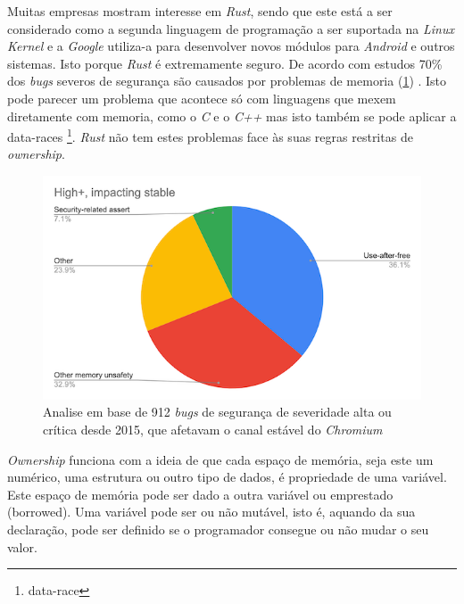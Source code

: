 Muitas empresas mostram interesse em \textit{Rust}, sendo que este está a ser considerado como a segunda linguagem de programação a ser suportada na \textit{Linux Kernel} e a \textit{Google} utiliza-a para desenvolver novos módulos para \textit{Android} e outros sistemas. Isto porque \textit{Rust} é extremamente seguro. De acordo com estudos 70\% dos \textit{bugs} severos de segurança são causados por problemas de memoria (\cref{fig:memory-errors}) \cite{microsoft_safety} \cite{chromium_safety}. Isto pode parecer um problema que acontece só com linguagens que mexem diretamente com memoria, como o \textit{C} e o \textit{C++} mas isto também se pode  aplicar a \glspl{data-race}
\footnote{\glsdesc{data-race}}.
\textit{Rust} não tem estes problemas face
às suas regras restritas de \textit{ownership}.

\begin{figure}[H]
    \centering
    \includegraphics[width=\textwidth]{images/memory-errors.png}
    \caption{Analise em base de 912 \textit{bugs} de segurança de severidade alta ou crítica desde 2015, que afetavam o canal estável do \textit{Chromium} \cite{chromium_safety}}
    \label{fig:memory-errors}
\end{figure}



\textit{Ownership} funciona com a ideia de que cada espaço de memória, seja este um numérico, uma estrutura ou outro tipo de dados, é propriedade de uma variável. Este espaço de memória pode ser dado a outra variável ou emprestado (borrowed). Uma variável pode ser ou não mutável, isto é, aquando da sua declaração, pode ser definido se o programador consegue ou não mudar o seu valor.

